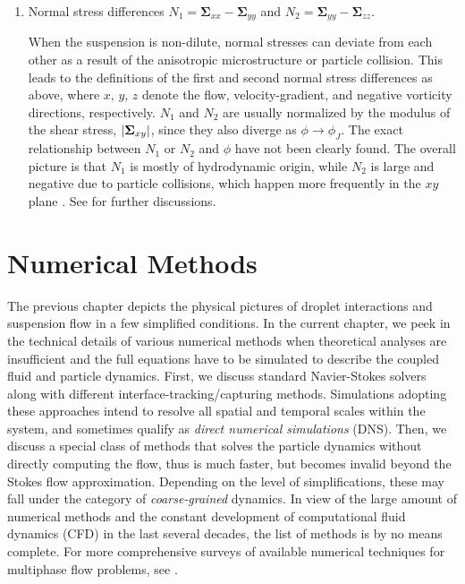\begin{enumerate}
\item Normal stress differences $N_1=\bm{\Sigma}_{xx}-\bm{\Sigma}_{yy}$ and $N_2=\bm{\Sigma}_{yy}-\bm{\Sigma}_{zz}$.

\medskip
When the suspension is non-dilute, normal stresses can deviate from each other as a result of the anisotropic microstructure or particle collision.
This leads to the definitions of the first and second normal stress differences as above, where $x$, $y$, $z$ denote the flow, velocity-gradient, and negative vorticity directions, respectively.
$N_1$ and $N_2$ are usually normalized by the modulus of the shear stress, $\lvert\bm{\Sigma}_{xy}\rvert$, since they also diverge as $\phi \to \phi_J$.
The exact relationship between $N_1$ or $N_2$ and $\phi$ have not been clearly found. The overall picture is that $N_1$ is mostly of hydrodynamic origin, while $N_2$ is large and negative due to particle collisions, which happen more frequently in the $xy$ plane \citep{guazzelli_pouliquen_2018}.
See \cite{seto_giusteri_2018} for further discussions.

\end{enumerate}



\chapter{Numerical Methods}  \label{chp:num-methods}


The previous chapter depicts the physical pictures of droplet interactions and suspension flow in a few simplified conditions.
In the current chapter, we peek in the technical details of various numerical methods when theoretical analyses are insufficient and the full equations have to be simulated to describe the coupled fluid and particle dynamics.
First, we discuss standard Navier-Stokes solvers along with different interface-tracking/capturing methods. Simulations adopting these approaches intend to resolve all spatial and temporal scales within the system, and sometimes qualify as \emph{direct numerical simulations} (DNS).
Then, we discuss a special class of methods that solves the particle dynamics without directly computing the flow, thus is much faster, but becomes invalid beyond the Stokes flow approximation. Depending on the level of simplifications, these may fall under the category of \emph{coarse-grained} dynamics.
In view of the large amount of numerical methods and the constant development of computational fluid dynamics (CFD) in the last several decades, the list of methods is by no means complete. For more comprehensive surveys of available numerical techniques for multiphase flow problems, see \cite{prosperetti_tryggvason_2007, Rosti2019}.



